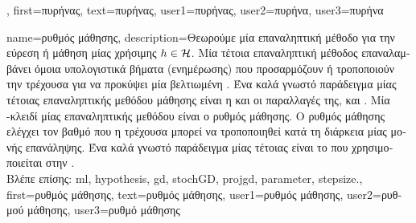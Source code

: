 {{%
		},
	first={\foreignlanguage{greek}{πυρήνας}},
	text={\foreignlanguage{greek}{πυρήνας}},
	user1={\foreignlanguage{greek}{πυρήνας}}, %
  	user2={\foreignlanguage{greek}{πυρήνα}}, %
	user3={\foreignlanguage{greek}{πυρήνα}} %
}

{name={\foreignlanguage{greek}{ρυθμός μάθησης}}, 
	description={\foreignlanguage{greek}{Θεωρούμε μία επαναληπτική μέθοδο} 
		 \foreignlanguage{greek}{για την εύρεση ή μάθηση μίας χρήσιμης}  $h \in \mathcal{H}$. 
		\foreignlanguage{greek}{Μία τέτοια επαναληπτική μέθοδος επαναλαμβάνει όμοια υπολογιστικά βήματα (ενημέρωσης) που  
		προσαρμόζουν ή τροποποιούν την τρέχουσα}  \foreignlanguage{greek}{για να προκύψει μία βελτιωμένη} 
		. \foreignlanguage{greek}{Ένα καλά γνωστό παράδειγμα μίας τέτοιας επαναληπτικής μεθόδου μάθησης είναι η}  
		 \foreignlanguage{greek}{και οι παραλλαγές της,}  \foreignlanguage{greek}{και}  
		. \foreignlanguage{greek}{Μία} -\foreignlanguage{greek}{κλειδί μίας επαναληπτικής μεθόδου 
		είναι ο ρυθμός μάθησης. Ο ρυθμός μάθησης ελέγχει τον βαθμό που η τρέχουσα}  \foreignlanguage{greek}{μπορεί να 
		τροποποιηθεί κατά τη διάρκεια μίας μονής επανάληψης. Ένα καλά γνωστό παράδειγμα μίας τέτοιας}  \foreignlanguage{greek}{είναι 
		το}  \foreignlanguage{greek}{που χρησιμοποιείται στην}  \cite[\foreignlanguage{greek}{Κεφ.} 5]{MLBasics}.\\
		\foreignlanguage{greek}{Βλέπε επίσης:} \gls{ml}, \gls{hypothesis}, \gls{gd}, \gls{stochGD}, \gls{projgd}, \gls{parameter}, \gls{stepsize}.},
	first={\foreignlanguage{greek}{ρυθμός μάθησης}},
	text={\foreignlanguage{greek}{ρυθμός μάθησης}},
	user1={\foreignlanguage{greek}{ρυθμός μάθησης}}, %
  	user2={\foreignlanguage{greek}{ρυθμού μάθησης}}, %
	user3={\foreignlanguage{greek}{ρυθμό μάθησης}} %
}

